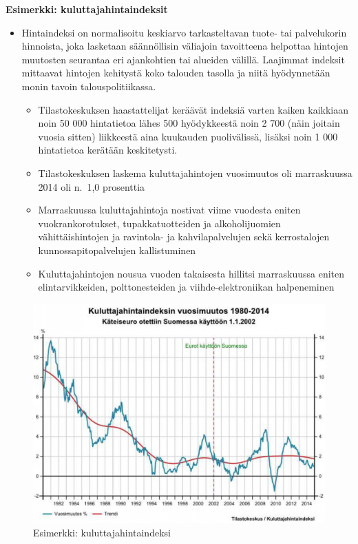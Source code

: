 \documentclass[
]{book}
\providecommand{\tightlist}{%
  \setlength{\itemsep}{0pt}\setlength{\parskip}{0pt}}
\begin{document}
\begin{eblock}{}

\textbf{Esimerkki: kuluttajahintaindeksit}

\begin{itemize}
\tightlist
\item
  Hintaindeksi on normalisoitu keskiarvo tarkasteltavan tuote- tai palvelukorin hinnoista, joka lasketaan säännöllisin väliajoin tavoitteena helpottaa hintojen muutosten seurantaa eri ajankohtien tai alueiden välillä. Laajimmat indeksit mittaavat hintojen kehitystä koko talouden tasolla ja niitä hyödynnetään monin tavoin talouspolitiikassa.

  \begin{itemize}
  \tightlist
  \item
    Tilastokeskuksen haastattelijat keräävät indeksiä varten kaiken kaikkiaan noin 50 000 hintatietoa lähes 500 hyödykkeestä noin 2 700 (näin joitain vuosia sitten) liikkeestä aina kuukauden puolivälissä, lisäksi noin 1 000 hintatietoa kerätään keskitetysti.
  \item
    Tilastokeskuksen laskema kuluttajahintojen vuosimuutos oli marraskuussa 2014 oli n.~1,0 prosenttia
  \item
    Marraskuussa kuluttajahintoja nostivat viime vuodesta eniten vuokrankorotukset, tupakkatuotteiden ja alkoholijuomien vähittäishintojen ja ravintola- ja kahvilapalvelujen sekä kerrostalojen kunnossapitopalvelujen kallistuminen
  \item
    Kuluttajahintojen nousua vuoden takaisesta hillitsi marraskuussa eniten elintarvikkeiden, polttonesteiden ja viihde-elektroniikan halpeneminen
  \end{itemize}
\end{itemize}

\end{eblock}

\begin{figure}

{\centering \includegraphics[width=1\linewidth]{images/kuluttaja} 

}

\caption{Esimerkki: kuluttajahintaindeksi}\label{fig:kuluttaja}
\end{figure}
\end{document}
